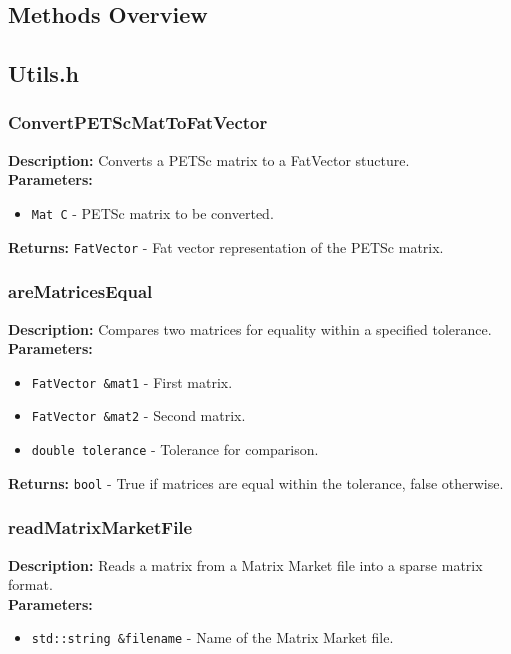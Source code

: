 \documentclass[12pt,oneside]{book} %
\begin{document}
\begin{subappendices}
    \section{Methods Overview}
    \subsection{Utils.h}
    \subsubsection{ConvertPETScMatToFatVector}

    \textbf{Description:} Converts a PETSc matrix to a FatVector stucture.\\

    \textbf{Parameters:}
    \begin{itemize}
        \item \texttt{Mat C} - PETSc matrix to be converted.
    \end{itemize}

    \textbf{Returns:} \texttt{FatVector} - Fat vector representation of the PETSc matrix.

    \subsubsection{areMatricesEqual}
    \textbf{Description:} Compares two matrices for equality within a specified tolerance.\\

    \textbf{Parameters:}
    \begin{itemize}
        \item \texttt{FatVector \&mat1} - First matrix.
        \item \texttt{FatVector \&mat2} - Second matrix.
        \item \texttt{double tolerance} - Tolerance for comparison.
    \end{itemize}

    \textbf{Returns:} \texttt{bool} - True if matrices are equal within the tolerance, false otherwise.

    \subsubsection{readMatrixMarketFile}
    \textbf{Description:} Reads a matrix from a Matrix Market file into a sparse matrix format.\\

    \textbf{Parameters:}
    \begin{itemize}
        \item \texttt{std::string \&filename} - Name of the Matrix Market file.
    \end{itemize}


\end{subappendices}
\end{document}

